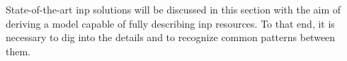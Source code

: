 State-of-the-art \gls{inp} solutions will be discussed in this section with the aim of deriving a model capable of fully describing \gls{inp} resources.
To that end, it is necessary to dig into the details and to recognize common patterns between them.